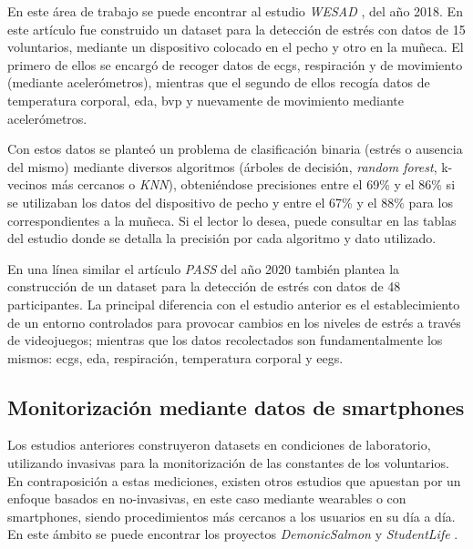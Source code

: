         En este área de trabajo se puede encontrar al estudio \textit{WESAD} \cite{schmidt_introducing_2018}, del año 2018. En este artículo fue construido un \gls{dataset} para la detección de estrés con datos de 15 voluntarios, mediante un dispositivo colocado en el pecho y otro en la muñeca. El primero de ellos se encargó de recoger datos de \glspl{ecg}, respiración y de movimiento (mediante acelerómetros), mientras que el segundo de ellos recogía datos de temperatura corporal, \gls{eda}, \gls{bvp} y nuevamente de movimiento mediante acelerómetros.

        Con estos datos se planteó un problema de clasificación binaria (estrés o ausencia del mismo) mediante diversos algoritmos (árboles de decisión, \textit{random forest}, k-vecinos más cercanos o \textit{KNN}), obteniéndose precisiones entre el 69\% y el 86\% si se utilizaban los datos del dispositivo de pecho y entre el 67\% y el 88\% para los correspondientes a la muñeca. Si el lector lo desea, puede consultar en \cite{schmidt_introducing_2018} las tablas del estudio donde se detalla la precisión por cada algoritmo y dato utilizado.

        En una línea similar el artículo \textit{PASS} \cite{parent_pass_2020} del año 2020 también plantea la construcción de un \gls{dataset} para la detección de estrés con datos de 48 participantes. La principal diferencia con el estudio anterior es el establecimiento de un entorno controlados para provocar cambios en los niveles de estrés a través de videojuegos; mientras que los datos recolectados son fundamentalmente los mismos: \glspl{ecg}, \gls{eda}, respiración, temperatura corporal y \glspl{eeg}.

    \subsection{Monitorización mediante datos de smartphones}
        \label{sec:estado_arte:smartphone}

        Los estudios anteriores construyeron \glspl{dataset} en condiciones de laboratorio, utilizando \glspl{invasiva} para la monitorización de las constantes de los voluntarios. En contraposición a estas mediciones, existen otros estudios que apuestan por un enfoque basados en \glspl{no-invasiva}, en este caso mediante \glspl{wearable} o con \glspl{smartphone}, siendo procedimientos más cercanos a los usuarios en su día a día. En este ámbito se puede encontrar los proyectos \textit{DemonicSalmon} \cite{boukhechba_demonicsalmon_2018} y \textit{StudentLife} \cite{rui_studentlife_2014}.

